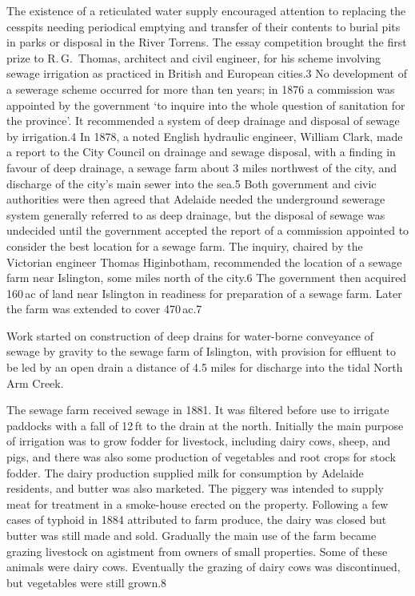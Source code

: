 The existence of a reticulated water supply encouraged attention to
replacing the cesspits needing periodical emptying and transfer of
their contents to burial pits in parks or disposal in the River
Torrens.  The essay competition brought the first prize to
R.\,G.~Thomas, architect and civil engineer, for his scheme involving
sewage irrigation as practiced in British and European cities.3 No
development of a sewerage scheme occurred for more than ten years; in
1876 a commission was appointed by the government `to inquire into the
whole question of sanitation for the province'.  It recommended a
system of deep drainage and disposal of sewage by irrigation.4 In
1878, a noted English hydraulic engineer, William Clark, made a report
to the City Council on drainage and sewage disposal, with a finding in
favour of deep drainage, a sewage farm about 3 miles northwest of the
city, and discharge of the city's main sewer into the sea.5 Both
government and civic authorities were then agreed that Adelaide needed
the underground sewerage system generally referred to as deep
drainage, but the disposal of sewage was undecided until the
government accepted the report of a commission appointed to consider
the best location for a sewage farm.  The inquiry, chaired by the
Victorian engineer Thomas Higinbotham, recommended the location of a
sewage farm near Islington, some miles north of the city.6 The
government then acquired 160\,ac of land near Islington in readiness
for preparation of a sewage farm. Later the farm was extended to cover
470\,ac.7

Work started on construction of deep drains for water-borne conveyance
of sewage by gravity to the sewage farm of Islington, with provision
for effluent to be led by an open drain a distance of 4.5 miles for
discharge into the tidal North Arm Creek.

The sewage farm received sewage in 1881.  It was filtered before use
to irrigate paddocks with a fall of 12\,ft to the drain at the north.
Initially the main purpose of irrigation was to grow fodder for
livestock, including dairy cows, sheep, and pigs, and there was also
some production of vegetables and root crops for stock fodder.  The
dairy production supplied milk for consumption by Adelaide residents,
and butter was also marketed.  The piggery was intended to supply meat
for treatment in a smoke-house erected on the property.  Following a
few cases of typhoid in 1884 attributed to farm produce, the dairy was
closed but butter was still made and sold.  Gradually the main use of
the farm became grazing livestock on agistment from owners of small
properties.  Some of these animals were dairy cows.  Eventually the
grazing of dairy cows was discontinued, but vegetables were still
grown.8

